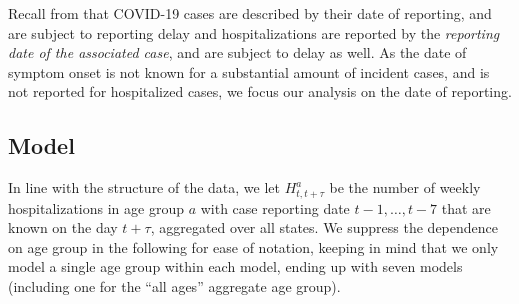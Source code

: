 Recall from  that COVID-19 cases are described by their date of reporting, and are subject to reporting delay and hospitalizations are reported by the \textit{reporting date of the associated case}, and are subject to delay as well. As the date of symptom onset is not known for a substantial amount of incident cases, and is not reported for hospitalized cases, we focus our analysis on the date of reporting.

\subsection{Model}
In line with the structure of the data, we let $H^a_{t,t + \tau}$ be the number of weekly hospitalizations in age group $a$ with case reporting date $t - 1, \dots, t - 7$ that are known on the day $t + \tau$, aggregated over all states. We suppress the dependence on age group in the following for ease of notation, keeping in mind that we only model a single age group within each model, ending up with seven models (including one for the ``all ages'' aggregate age group). 

